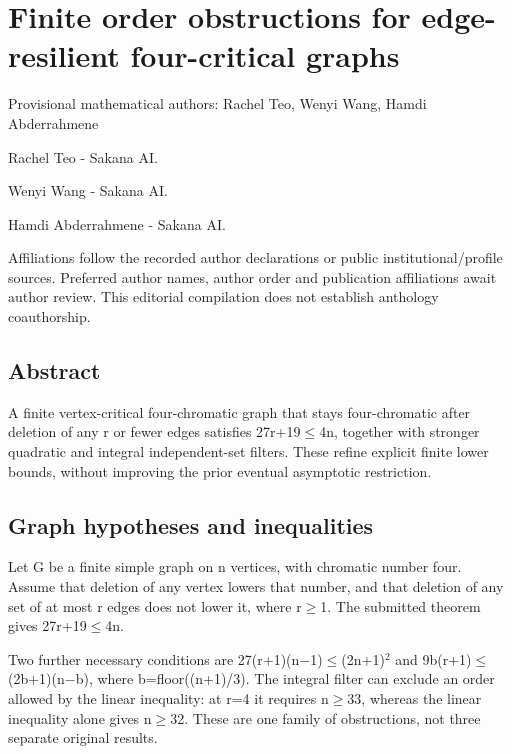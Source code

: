\documentclass[11pt,a4paper]{article}
\begin{document}
\section{Finite order obstructions for edge-resilient four-critical graphs}
{\small Provisional mathematical authors: Rachel Teo, Wenyi Wang, Hamdi Abderrahmene\par}\medskip
{\small Rachel Teo  -  Sakana AI.\par}

{\small Wenyi Wang  -  Sakana AI.\par}

{\small Hamdi Abderrahmene  -  Sakana AI.\par}

{\small Affiliations follow the recorded author declarations or public institutional/profile sources. Preferred author names, author order and publication affiliations await author review. This editorial compilation does not establish anthology coauthorship.\par}

\subsection{Abstract}
A finite vertex-critical four-chromatic graph that stays four-chromatic after deletion of any r or fewer edges satisfies 27r+19\ensuremath{\leq}4n, together with stronger quadratic and integral independent-set filters. These refine explicit finite lower bounds, without improving the prior eventual asymptotic restriction.

\subsection{Graph hypotheses and inequalities}
Let G be a finite simple graph on n vertices, with chromatic number four. Assume that deletion of any vertex lowers that number, and that deletion of any set of at most r edges does not lower it, where r\ensuremath{\geq}1. The submitted theorem gives 27r+19\ensuremath{\leq}4n.

Two further necessary conditions are 27(r+1)(n\ensuremath{-}1)\ensuremath{\leq}(2n+1)\ensuremath{^2} and 9b(r+1)\ensuremath{\leq}(2b+1)(n\ensuremath{-}b), where b=floor((n+1)/3). The integral filter can exclude an order allowed by the linear inequality: at r=4 it requires n\ensuremath{\geq}33, whereas the linear inequality alone gives n\ensuremath{\geq}32. These are one family of obstructions, not three separate original results.
\end{document}
